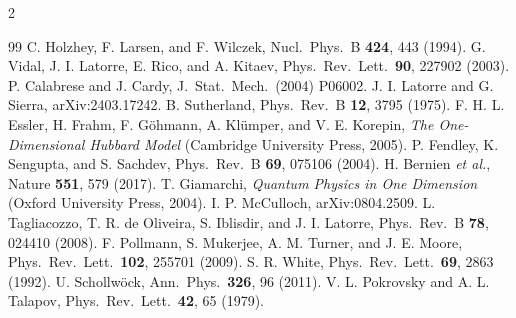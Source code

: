 \documentclass[11pt]{article}
\begin{document}
\begin{multicols}{2}\footnotesize
\begin{thebibliography}{99}\setlength{\itemsep}{0pt}
 C. Holzhey, F. Larsen, and F. Wilczek, Nucl.\ Phys.\ B \textbf{424}, 443 (1994).
 G. Vidal, J. I. Latorre, E. Rico, and A. Kitaev, Phys.\ Rev.\ Lett.\ \textbf{90}, 227902 (2003).
 P. Calabrese and J. Cardy, J.\ Stat.\ Mech.\ (2004) P06002.
 J. I. Latorre and G. Sierra, arXiv:2403.17242.
 B. Sutherland, Phys.\ Rev.\ B \textbf{12}, 3795 (1975).
 F. H. L. Essler, H. Frahm, F. G\"ohmann, A. Kl\"umper, and V. E. Korepin, \textit{The One-Dimensional Hubbard Model} (Cambridge University Press, 2005).
 P. Fendley, K. Sengupta, and S. Sachdev, Phys.\ Rev.\ B \textbf{69}, 075106 (2004).
 H. Bernien \textit{et al.}, Nature \textbf{551}, 579 (2017).
 T. Giamarchi, \textit{Quantum Physics in One Dimension} (Oxford University Press, 2004).
 I. P. McCulloch, arXiv:0804.2509.
 L. Tagliacozzo, T. R. de Oliveira, S. Iblisdir, and J. I. Latorre, Phys.\ Rev.\ B \textbf{78}, 024410 (2008).
 F. Pollmann, S. Mukerjee, A. M. Turner, and J. E. Moore, Phys.\ Rev.\ Lett.\ \textbf{102}, 255701 (2009).
 S. R. White, Phys.\ Rev.\ Lett.\ \textbf{69}, 2863 (1992).
 U. Schollw\"ock, Ann.\ Phys.\ \textbf{326}, 96 (2011).
 V. L. Pokrovsky and A. L. Talapov, Phys.\ Rev.\ Lett.\ \textbf{42}, 65 (1979).
\end{thebibliography}
\end{multicols}
\end{document}
